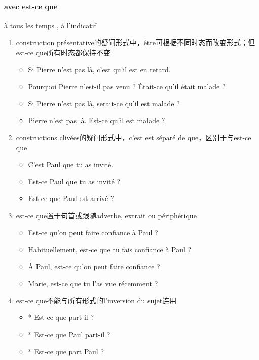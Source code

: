 \documentclass[UTF8]{report}
\begin{document}
\paragraph{avec est-ce que}
à tous les temps , à l’indicatif
\begin{enumerate}
    \item construction présentative的疑问形式中，être可根据不同时态而改变形式；但est-ce que所有时态都保持不变
    \begin{itemize}
        \item Si Pierre n’est pas là, c’est qu’il est en retard.
        \item  Pourquoi Pierre n’est-il pas venu ? Était-ce qu’il était malade ?
        \item Si Pierre n’est pas là, serait-ce qu’il est malade ?
        \item Pierre n’est pas là. Est-ce qu’il est malade ?
    \end{itemize}
    \item constructions clivées的疑问形式中，c’est est séparé de que，区别于与est-ce que
    \begin{itemize}
        \item C’est Paul que tu as invité.
        \item Est-ce Paul que tu as invité ?
        \item Est-ce que Paul est arrivé ?
    \end{itemize}
    \item est-ce que置于句首或跟随adverbe, extrait ou périphérique
    \begin{itemize}
        \item Est-ce qu’on peut faire confiance à Paul ?
        \item Habituellement, est-ce que tu fais confiance à Paul ?
        \item À Paul, est-ce qu’on peut faire confiance ?
        \item Marie, est-ce que tu l’as vue récemment ?
    \end{itemize}
    \item est-ce que不能与所有形式的l’inversion du sujet连用
    \begin{itemize}
        \item * Est-ce que part-il ?
        \item * Est-ce que Paul part-il ?
        \item * Est-ce que part Paul ?
    \end{itemize}
\end{enumerate}
\end{document}
